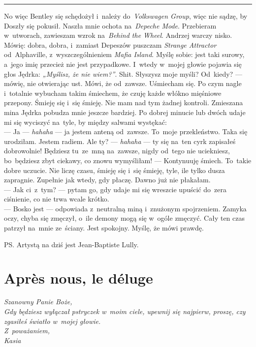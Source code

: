 \documentclass[9pt, a5paper]{memoir}
\begin{document}
\fancybreak{* \quad * \quad *}

No więc Bentley się schędożył i~należy do~\textit{Volkswagen Group}, więc nie sądzę, by Doszły się pokusił. Naszła mnie ochota na~\textit{Depeche Mode}. Przebieram w~utworach, zawieszam wzrok na~\textit{Behind the Wheel}. Andrzej warczy nisko. Mówię: dobra, dobra, i~zamiast Depeszów puszczam \textit{Strange Attractor} od~Alphaville, z~wyszczególnieniem \textit{Mafia Island}. Myślę sobie: jest taki surowy, a~jego imię przecież nie jest przypadkowe. I~wtedy w~mojej głowie pojawia się głos Jędrka: \textit{„Myślisz, że nie wiem?”}. Shit. Słyszysz moje myśli? Od~kiedy? --- mówię, nie otwierając ust. Mówi, że od~zawsze. Uśmiecham się. Po czym nagle i~totalnie wybucham takim śmiechem, że czuję każde włókno mięśniowe przepony. Śmieję się i~się śmieję. Nie mam nad tym żadnej kontroli. Zmieszana mina Jędrka pobudza mnie jeszcze bardziej. Po dobrej minucie lub dwóch udaje mi się wyciszyć na~tyle, by między salwami wystękać:\\
--- Ja --- \textit{hahaha} --- ja jestem anteną od~zawsze. To~moje przekleństwo. Taka się urodziłam. Jestem radiem. Ale ty? --- \textit{hahaha} --- ty się na~ten cyrk zapisałeś dobrowolnie! Będziesz tu~ze~mną na~zawsze, nigdy od~tego nie uciekniesz, bo~będziesz zbyt ciekawy, co znowu wymyśliłam! --- Kontynuuję śmiech. To~takie dobre uczucie. Nie liczę czasu, śmieję się i~się śmieję, tyle, ile tylko dusza zapragnie. Zupełnie jak wtedy, gdy płaczę. Dawno już nie płakałam.\\
--- Jak ci~z~tym? --- pytam go, gdy udaje mi się wreszcie upuścić do~zera ciśnienie, co nie trwa wcale krótko.\\
--- Bosko jest --- odpowiada z~neutralną miną i~znużonym spojrzeniem. Zamyka oczy, chyba się zmęczył, o~ile demony mogą się w~ogóle zmęczyć. Cały ten czas patrzył na~mnie ze~ściany. Jest spokojny. Myślę, że mówi prawdę.

\bigskip
\noindent
PS. Artystą na dziś jest Jean-Baptiste Lully.

\newpage
\section{Après nous, le déluge}
{
\itshape
Szanowny Panie Boże,\\
Gdy będziesz wyłączał pstryczek w~moim ciele, upewnij się najpierw, proszę, czy zgasiłeś światło w~mojej głowie.\\
Z~poważaniem,\\
Kasia
}
\end{document}
